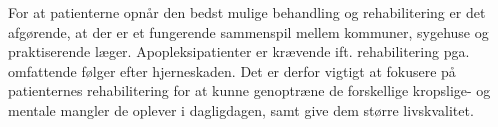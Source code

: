 For at patienterne opnår den bedst mulige behandling og rehabilitering er det afgørende, at der er et fungerende sammenspil mellem kommuner, sygehuse og praktiserende læger. Apopleksipatienter er krævende ift. rehabilitering pga. omfattende følger efter hjerneskaden. \cite{Sundhedsstyrelsen2010} Det er derfor vigtigt at fokusere på patienternes rehabilitering for at kunne genoptræne de forskellige kropslige- og mentale mangler de oplever i dagligdagen, samt give dem større livskvalitet. 





